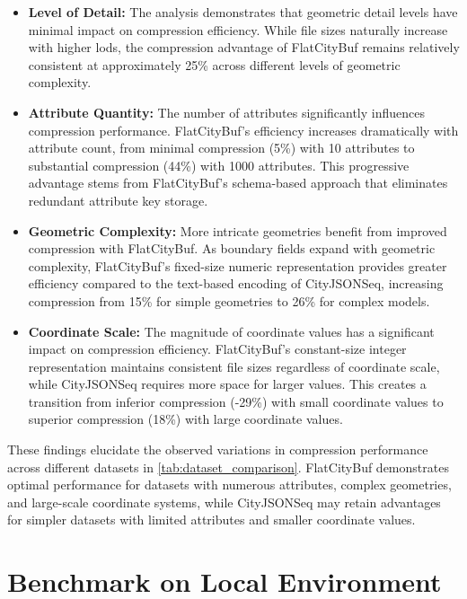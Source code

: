 \begin{itemize}
  \item \textbf{Level of Detail:} The analysis demonstrates that geometric detail levels have minimal impact on compression efficiency. While file sizes naturally increase with higher \ac{lod}s, the compression advantage of FlatCityBuf remains relatively consistent at approximately 25\% across different levels of geometric complexity.

  \item \textbf{Attribute Quantity:} The number of attributes significantly influences compression performance. FlatCityBuf's efficiency increases dramatically with attribute count, from minimal compression (5\%) with 10 attributes to substantial compression (44\%) with 1000 attributes. This progressive advantage stems from FlatCityBuf's schema-based approach that eliminates redundant attribute key storage.

  \item \textbf{Geometric Complexity:} More intricate geometries benefit from improved compression with FlatCityBuf. As boundary fields expand with geometric complexity, FlatCityBuf's fixed-size numeric representation provides greater efficiency compared to the text-based encoding of CityJSONSeq, increasing compression from 15\% for simple geometries to 26\% for complex models.

  \item \textbf{Coordinate Scale:} The magnitude of coordinate values has a significant impact on compression efficiency. FlatCityBuf's constant-size integer representation maintains consistent file sizes regardless of coordinate scale, while CityJSONSeq requires more space for larger values. This creates a transition from inferior compression (-29\%) with small coordinate values to superior compression (18\%) with large coordinate values.
\end{itemize}

These findings elucidate the observed variations in compression performance across different datasets in \autoref{tab:dataset_comparison}. FlatCityBuf demonstrates optimal performance for datasets with numerous attributes, complex geometries, and large-scale coordinate systems, while CityJSONSeq may retain advantages for simpler datasets with limited attributes and smaller coordinate values.

\section{Benchmark on Local Environment}
\label{result:benchmark_on_local_environment}

